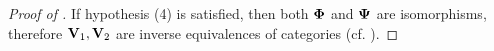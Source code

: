 \begin{proof}[Proof of ]
If hypothesis (4) is satisfied, then both ${\bf \Phi}$ and ${\bf \Psi}$ are isomorphisms, therefore ${\bf V}_1, {\bf V}_2$ are inverse equivalences of categories (cf. ).
\end{proof}



